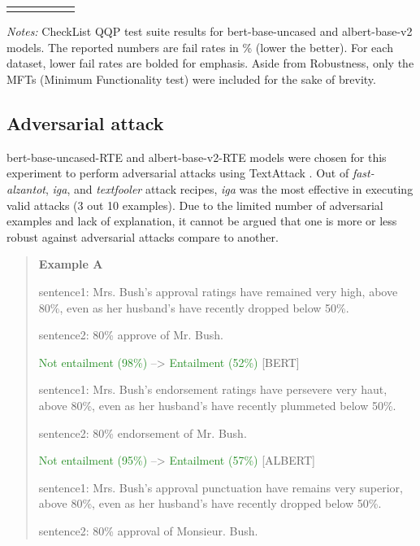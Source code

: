 \documentclass{article}
\begin{document}
\begin{table}[!htbp]
\begin{threeparttable}[b]
\begin{tabular}{llrrrr}
  \multicolumn{1}{l}{} &
  \multicolumn{1}{l}{} &
  \multicolumn{1}{l}{}
\end{tabular}
\begin{tablenotes}[flushleft]
\footnotesize 
\item \textit{Notes:} CheckList QQP test suite results for bert-base-uncased and albert-base-v2 models. The reported numbers are fail rates in \% (lower the better). For each dataset, lower fail rates are bolded for emphasis. Aside from Robustness, only the MFTs (Minimum Functionality test) were included for the sake of brevity.
\end{tablenotes}
\end{threeparttable}
\label{checklist-qqp-testing-results}
\end{table}

\clearpage

\subsection{Adversarial attack} \label{adversarial-attack}

bert-base-uncased-RTE and albert-base-v2-RTE models were chosen for this experiment to perform adversarial attacks using TextAttack \cite{Morris2020TextAttackAF}. Out of \emph{fast-alzantot}, \emph{iga}, and \emph{textfooler} attack recipes, \emph{iga} was the most effective in executing valid attacks (3 out 10 examples). Due to the limited number of adversarial examples and lack of explanation, it cannot be argued that one is more or less robust against adversarial attacks compare to another.


\begin{quote}
\textbf{Example A}

sentence1: Mrs. Bush's approval ratings have remained very high, above 80\%, even as her husband's have recently dropped below 50\%.

sentence2: 80\% approve of Mr. Bush.

\textcolor{ForestGreen}{Not entailment (98\%)} --> \textcolor{ForestGreen}{Entailment (52\%)} [BERT] 

sentence1: Mrs. Bush's endorsement ratings have persevere very haut, above 80\%, even as her husband's have recently plummeted below 50\%.

sentence2: 80\% endorsement of Mr. Bush.

\textcolor{ForestGreen}{Not entailment (95\%)} --> \textcolor{ForestGreen}{Entailment (57\%)} [ALBERT] 

sentence1: Mrs. Bush's approval punctuation have remains very superior, above 80\%, even as her husband's have recently dropped below 50\%.

sentence2: 80\% approval of Monsieur. Bush.
\end{quote}
\end{document}
